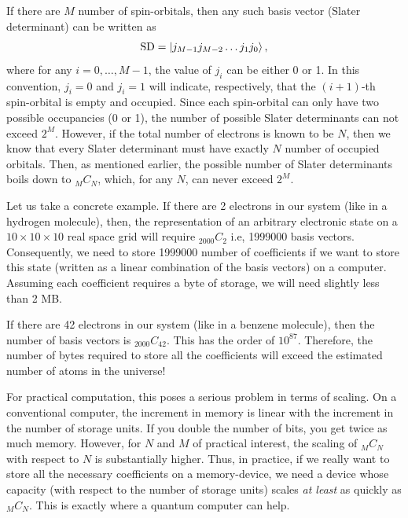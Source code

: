\documentclass[12pt,oneside]{book}
\begin{document}
If there are $M$ number of spin-orbitals, then any such basis vector (Slater determinant) can be written as
\begin{align}\label{SD_OccupationRepresentation}
    \mathrm{SD}=\ket{j_{M-1}j_{M-2}\hdots j_1 j_0},
\end{align}
where for any $i=0,\hdots,M-1$, the value of $j_i$ can be either 0 or 1. In this convention, $j_i=0$ and $j_i=1$ will indicate, respectively, that the $(i+1)$-th spin-orbital is empty and occupied. Since each spin-orbital can only have two possible occupancies (0 or 1), the number of possible Slater determinants can not exceed $2^M$. However, if the total number of electrons is known to be $N$, then we know that every Slater determinant must have exactly $N$ number of occupied orbitals. Then, as mentioned earlier, the possible number of Slater determinants boils down to $_MC_N$, which, for any $N$, can never exceed $2^M$.

Let us take a concrete example. If there are 2 electrons in our system (like in a hydrogen molecule), then, the representation of an arbitrary electronic state on a $10 \times 10 \times 10$ real space grid will require $_{2000}C_2$ i.e, 1999000 basis vectors. Consequently, we need to store 1999000 number of coefficients if we want to store this state (written as a linear combination of the basis vectors) on a computer. Assuming each coefficient requires a byte of storage, we will need slightly less than 2 MB. 

If there are 42 electrons in our system (like in a benzene molecule), then the number of basis vectors is $_{2000}C_{42}$. This has the order of $10^{87}$. Therefore, the number of bytes required to store all the coefficients will exceed the estimated number of atoms in the universe!

For practical computation, this poses a serious problem in terms of scaling. On a conventional computer, the increment in memory is linear with the increment in the number of storage units. If you double the number of bits, you get twice as much memory. However, for $N$ and $M$ of practical interest, the scaling of $_{M}C_N$  with respect to $N$ is substantially higher. Thus, in practice, if we really want to store all the necessary coefficients on a memory-device, we need a device whose capacity (with respect to the number of storage units) scales \textit{at least} as quickly as $_{M}C_N$. This is exactly where a quantum computer can help.


\end{document}
